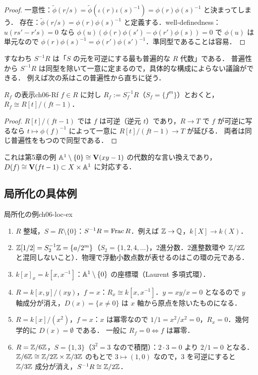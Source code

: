 \begin{proof}
一意性：$\tilde\phi(r/s)=\tilde\phi(\iota(r)\iota(s)^{-1})=\phi(r)\phi(s)^{-1}$ と決まってしまう．
存在：$\tilde\phi(r/s)=\phi(r)\phi(s)^{-1}$ と定義する．well-definedness：$u(rs'-r's)=0$ なら
$\phi(u)(\phi(r)\phi(s')-\phi(r')\phi(s))=0$ で $\phi(u)$ は単元なので $\phi(r)\phi(s)^{-1}=\phi(r')\phi(s')^{-1}$．準同型であることは容易．
\end{proof}

すなわち $S^{-1}R$ は「$S$ の元を可逆にする最も普遍的な $R$ 代数」である．
普遍性から $S^{-1}R$ は同型を除いて一意に定まるので，具体的な構成によらない議論ができる．
例えば次の系はこの普遍性から直ちに従う．

\begin{mycor}{$R_f$ の表示}{ch06-Rf}
$f\in R$ に対し $R_f:=S_f^{-1}R$（$S_f=\{f^m\}$）とおくと，$R_f\cong R[t]/(ft-1)$．
\end{mycor}

\begin{proof}
$R[t]/(ft-1)$ では $f$ は可逆（逆元 $t$）であり，$R\to T$ で $f$ が可逆に写るなら $t\mapsto\phi(f)^{-1}$ によって一意に $R[t]/(ft-1)\to T$ が延びる．
両者は同じ普遍性をもつので同型である．
\end{proof}

これは第5章の例 $\mathbb{A}^1\setminus\{0\}\cong\mathbf{V}(xy-1)$ の代数的な言い換えであり，$D(f)\cong\mathbf{V}(f t-1)\subset X\times\mathbb{A}^1$ に対応する．

\subsection{局所化の具体例}

\begin{myex}{局所化の例}{ch06-loc-ex}
\begin{enumerate}
  \item $R$ 整域，$S=R\setminus\{0\}$：$S^{-1}R=\operatorname{Frac} R$．例えば $\mathbb{Z}\to\mathbb{Q}$，$k[X]\to k(X)$．
  \item $\mathbb{Z}[1/2]=S_2^{-1}\mathbb{Z}=\{a/2^m\}$（$S_2=\{1,2,4,\dots\}$，2進分数．2進整数環や $\mathbb{Z}/2\mathbb{Z}$ と混同しないこと）．物理で浮動小数点数が表せるのはこの環の元である．
  \item $k[x]_x=k[x,x^{-1}]$：$\mathbb{A}^1\setminus\{0\}$ の座標環（Laurent 多項式環）．
  \item $R=k[x,y]/(xy)$，$f=x$：$R_x\cong k[x,x^{-1}]$．$y=xy/x=0$ となるので $y$ 軸成分が消え，$D(x)=\{x\ne0\}$ は $x$ 軸から原点を除いたものになる．
  \item $R=k[x]/(x^2)$，$f=x$：$x$ は冪零なので $1/1=x^2/x^2=0$，$R_x=0$．幾何学的に $D(x)=\emptyset$ である．
        一般に $R_f=0\iff f$ は冪零．
  \item $R=\mathbb{Z}/6\mathbb{Z}$，$S=\{1,3\}$（$3^2=3$ なので積閉）：$2\cdot3=0$ より $2/1=0$ となる．
        $\mathbb{Z}/6\mathbb{Z}\cong\mathbb{Z}/2\mathbb{Z}\times\mathbb{Z}/3\mathbb{Z}$ のもとで $3\mapsto(1,0)$ なので，$3$ を可逆にすると $\mathbb{Z}/3\mathbb{Z}$ 成分が消え，$S^{-1}R\cong\mathbb{Z}/2\mathbb{Z}$．
\end{enumerate}
\end{myex}

